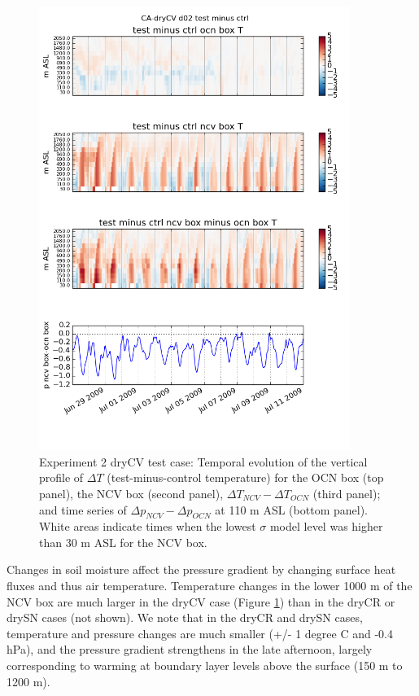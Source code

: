 \begin{figure}[here]
\includegraphics[width=0.9\textwidth]{ch3-wind/img/timeheight_T_pdiff_ocnbox_ncvbox_diff_dryCV.png}
\caption{Experiment 2 dryCV test case: Temporal evolution of the vertical profile of $\Delta T$ (test-minus-control temperature) for the OCN box (top panel), the NCV box (second panel), $\Delta T_{NCV} - \Delta T_{OCN}$ (third panel); and time series of $\Delta p_{NCV} - \Delta p_{OCN}$ at 110 m ASL (bottom panel).  White areas indicate times when the lowest $\sigma$ model level was higher than 30 m ASL for the NCV box.}
\label{fig:windSol_TimeHeightDryCV}
\end{figure}

Changes in soil moisture affect the pressure gradient by changing surface heat fluxes and thus air temperature.  Temperature changes in the lower 1000 m of the NCV box are much larger in the dryCV case (Figure \ref{fig:windSol_TimeHeightDryCV}) than in the dryCR or drySN cases (not shown).  We note that in the dryCR and drySN cases, temperature and pressure changes are much smaller (+/- 1 degree C and -0.4 hPa), and the pressure gradient strengthens in the late afternoon, largely corresponding to warming at boundary layer levels above the surface (150 m to 1200 m).

